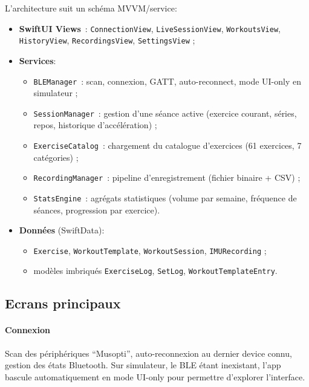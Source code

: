\documentclass[a4paper,11pt]{article}
\begin{document}
L'architecture suit un schéma MVVM/service:
\begin{itemize}
  \item \textbf{SwiftUI Views}~: \texttt{ConnectionView}, \texttt{LiveSessionView}, \texttt{WorkoutsView}, \texttt{HistoryView}, \texttt{RecordingsView}, \texttt{SettingsView} ;
  \item \textbf{Services}:
  \begin{itemize}
    \item \texttt{BLEManager}~: scan, connexion, GATT, auto-reconnect, mode UI-only en simulateur ;
    \item \texttt{SessionManager}~: gestion d'une séance active (exercice courant, séries, repos, historique d'accélération) ;
    \item \texttt{ExerciseCatalog}~: chargement du catalogue d'exercices (61 exercices, 7 catégories) ;
    \item \texttt{RecordingManager}~: pipeline d'enregistrement (fichier binaire + CSV) ;
    \item \texttt{StatsEngine}~: agrégats statistiques (volume par semaine, fréquence de séances, progression par exercice).
  \end{itemize}
  \item \textbf{Données} (SwiftData):
  \begin{itemize}
    \item \texttt{Exercise}, \texttt{WorkoutTemplate}, \texttt{WorkoutSession}, \texttt{IMURecording} ;
    \item modèles imbriqués \texttt{ExerciseLog}, \texttt{SetLog}, \texttt{WorkoutTemplateEntry}.
  \end{itemize}
\end{itemize}

\subsection{Ecrans principaux}

\paragraph{Connexion}
Scan des périphériques ``Musopti'', auto-reconnexion au dernier device connu, gestion des états Bluetooth. Sur simulateur, le BLE étant inexistant, l'app bascule automatiquement en mode UI-only pour permettre d'explorer l'interface.
\end{document}
